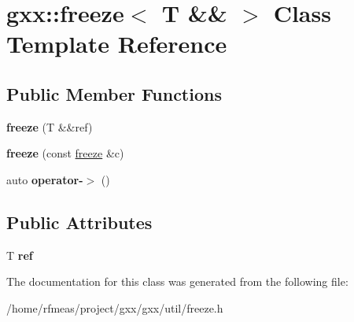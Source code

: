 \hypertarget{classgxx_1_1freeze_3_01T_01_6_6_01_4}{}\section{gxx\+:\+:freeze$<$ T \&\& $>$ Class Template Reference}
\label{classgxx_1_1freeze_3_01T_01_6_6_01_4}
\subsection*{Public Member Functions}
\begin{DoxyCompactItemize}
\item 
{\bfseries freeze} (T \&\&ref)\hypertarget{classgxx_1_1freeze_3_01T_01_6_6_01_4_a56385bb0994f9c48666b941288f4df3b}{}\label{classgxx_1_1freeze_3_01T_01_6_6_01_4_a56385bb0994f9c48666b941288f4df3b}

\item 
{\bfseries freeze} (const \hyperlink{classgxx_1_1freeze}{freeze} \&c)\hypertarget{classgxx_1_1freeze_3_01T_01_6_6_01_4_a1791786720e49fb9a81d9832b10f37c6}{}\label{classgxx_1_1freeze_3_01T_01_6_6_01_4_a1791786720e49fb9a81d9832b10f37c6}

\item 
auto {\bfseries operator-\/$>$} ()\hypertarget{classgxx_1_1freeze_3_01T_01_6_6_01_4_a88b65a69d05c85583d6125029df99b39}{}\label{classgxx_1_1freeze_3_01T_01_6_6_01_4_a88b65a69d05c85583d6125029df99b39}

\end{DoxyCompactItemize}
\subsection*{Public Attributes}
\begin{DoxyCompactItemize}
\item 
T {\bfseries ref}\hypertarget{classgxx_1_1freeze_3_01T_01_6_6_01_4_acf980049f19849e489b6da6f6c404423}{}\label{classgxx_1_1freeze_3_01T_01_6_6_01_4_acf980049f19849e489b6da6f6c404423}

\end{DoxyCompactItemize}


The documentation for this class was generated from the following file\+:\begin{DoxyCompactItemize}
\item 
/home/rfmeas/project/gxx/gxx/util/freeze.\+h\end{DoxyCompactItemize}
